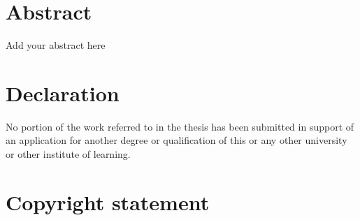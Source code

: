 \begin{justify}

\tableofcontents

\clearpage

\listoffigures

\clearpage

\listoftables


\clearpage
\chapter{\fontsize{24pt}{20pt}\selectfont \textbf{Abstract}}
\thispagestyle{plain}
\vspace{0.1 in}
\noindent

Add your abstract here

\clearpage
\thispagestyle{plain}
\chapter{\fontsize{24pt}{20pt}\selectfont \textbf{Declaration}}

\vspace{0.1 in}
\noindent

No portion of the work referred to in the thesis has been submitted in support of an application for another degree or qualification of this or any other university or other institute of learning.

\clearpage
\thispagestyle{plain}
\chapter{\fontsize{24pt}{20pt}\selectfont \textbf{Copyright statement}}

\vspace{0.1 in}
\noindent


\end{justify}
